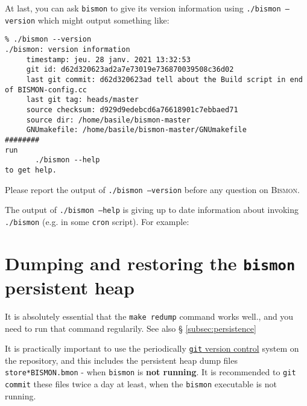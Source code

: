 \begin{appendices}
At last, you can ask \texttt{bismon} to give its version information
using \texttt{./bismon --version} which might output something like:

\begin{relsize}{-1}
\begin{verbatim}
% ./bismon --version
./bismon: version information
	 timestamp: jeu. 28 janv. 2021 13:32:53
	 git id: d62d320623ad2a7e73019e736870039508c36d02
	 last git commit: d62d320623ad tell about the Build script in end of BISMON-config.cc
	 last git tag: heads/master
	 source checksum: d929d9edebcd6a76618901c7ebbaed71
	 source dir: /home/basile/bismon-master
	 GNUmakefile: /home/basile/bismon-master/GNUmakefile
########
run
	   ./bismon --help
to get help.
\end{verbatim}
\end{relsize}
Please report the output of \texttt{./bismon --version} before any question on \textsc{Bismon}.

The output of \texttt{./bismon --help} is giving up to date information about invoking \texttt{./bismon} (e.g. in some \texttt{cron} script). For example:

\begin{relsize}{-1.5}

\end{relsize}

\section{Dumping and restoring the \texttt{bismon} persistent heap}
\label{sec:dumping-restoring-heap}

It is absolutely essential that the \texttt{make redump} command works
well., and you need to run that command regularily.
 See also \S
\ref{subsec:persistence}

It is practically important to use the periodically
\href{http://git-scm.com/}{\texttt{git} version control} system on the
repository, and this includes the persistent heap dump files
\texttt{store*BISMON.bmon} - when \texttt{bismon} is \textbf{not
  running}. It is recommended to \texttt{git commit} these files twice
a day at least, when the \texttt{bismon} executable is not running.

\end{appendices}
